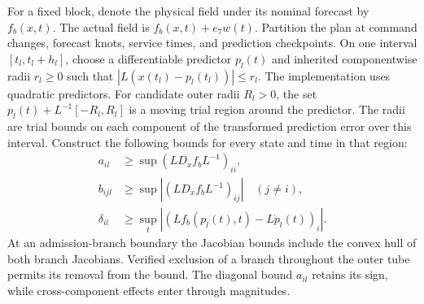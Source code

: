 \documentclass[preprint,12pt]{elsarticle}
\begin{document}
For a fixed block, denote the physical field under its nominal forecast by
$f_b(x,t)$. The actual field is $f_b(x,t)+e_7w(t)$. Partition the plan at
command changes, forecast knots, service times, and prediction checkpoints.
On one interval $[t_l,t_l+h_l]$, choose a differentiable predictor $p_l(t)$
and inherited componentwise radii $r_l\ge0$ such that
$|L(x(t_l)-p_l(t_l))|\le r_l$. The implementation uses quadratic predictors.
For candidate outer radii $R_l>0$, the set
$p_l(t)+L^{-1}[-R_l,R_l]$ is a moving trial region around the predictor.
The radii are trial bounds on each component of the transformed prediction
error over this interval. Construct
the following bounds for every state and time in that region:
\begin{equation}
 \begin{aligned}
 a_{il}&\ge\sup (L D_xf_b L^{-1})_{ii},\\
 b_{ijl}&\ge\sup |(L D_xf_b L^{-1})_{ij}|\quad(j\ne i),\\
 \delta_{il}&\ge\sup_t |(L f_b(p_l(t),t)-L\dot p_l(t))_i|.
 \end{aligned}
 \label{eq:new-local-bounds}
\end{equation}
At an admission-branch boundary the Jacobian bounds include the convex hull
of both branch Jacobians. Verified exclusion of a branch throughout the
outer tube permits its removal from the bound. The diagonal bound $a_{il}$
retains its sign, while cross-component effects enter through magnitudes.
\end{document}
